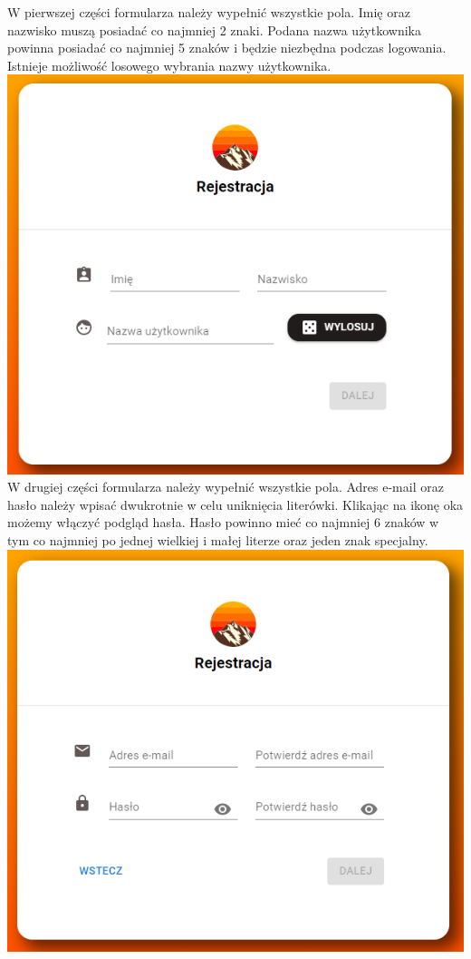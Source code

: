\documentclass[12pt]{article}
\begin{document}
\begin{flushleft}
\begin{itemize}
			W pierwszej części formularza należy wypełnić wszystkie pola. Imię oraz nazwisko muszą posiadać co najmniej 2 znaki. Podana nazwa użytkownika powinna posiadać co najmniej 5 znaków i będzie niezbędna podczas logowania. Istnieje możliwość losowego wybrania nazwy użytkownika. \linebreak
			\includegraphics[scale=0.3]{Rejestracja2.png} \linebreak
			W drugiej części formularza należy wypełnić wszystkie pola. Adres e-mail oraz hasło należy wpisać dwukrotnie w celu uniknięcia literówki. Klikając na ikonę oka możemy włączyć podgląd hasła. Hasło powinno mieć co najmniej 6 znaków w tym co najmniej po jednej wielkiej i małej literze oraz jeden znak specjalny.\linebreak
			\includegraphics[scale=0.3]{Rejestracja3.png} \linebreak

\end{itemize}
\end{flushleft}
\end{document}
